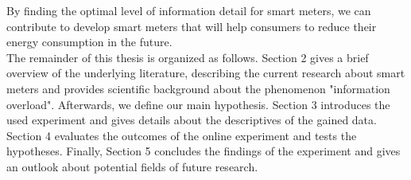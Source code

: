 By finding the optimal level of information detail for smart meters, we can contribute to develop smart meters that will help consumers to reduce their energy consumption in the future.\\ 
The remainder of this thesis is organized as follows. Section 2 gives a brief overview of the underlying literature, describing the current research about smart meters and provides scientific background about the phenomenon "information overload". Afterwards, we define our main hypothesis.
Section 3 introduces the used experiment and gives details about the descriptives of the gained data. Section 4 evaluates the outcomes of the online experiment and tests the hypotheses. Finally, Section 5 concludes the findings of the experiment and gives an outlook about potential fields of future research.